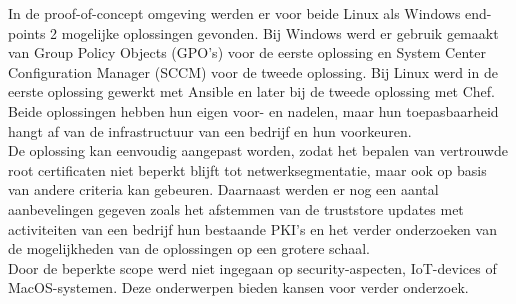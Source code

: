 In de proof-of-concept omgeving werden er voor beide Linux als Windows end-points 2 mogelijke oplossingen gevonden.
Bij Windows werd er gebruik gemaakt van Group Policy Objects (GPO's) voor de eerste oplossing en System Center Configuration Manager (SCCM) voor de tweede oplossing.
Bij Linux werd in de eerste oplossing gewerkt met Ansible en later bij de tweede oplossing met Chef. 
Beide oplossingen hebben hun eigen voor- en nadelen, maar hun toepasbaarheid hangt af van de infrastructuur van een bedrijf en hun voorkeuren. \\

De oplossing kan eenvoudig aangepast worden, zodat het bepalen van vertrouwde root certificaten niet beperkt blijft tot netwerksegmentatie, maar ook op basis van andere criteria kan gebeuren.
Daarnaast werden er nog een aantal aanbevelingen gegeven zoals het afstemmen van de truststore updates met activiteiten van een bedrijf hun bestaande PKI's en het verder onderzoeken van de mogelijkheden van de oplossingen op een grotere schaal. \\


Door de beperkte scope werd niet ingegaan op security-aspecten, IoT-devices of MacOS-systemen. Deze onderwerpen bieden kansen voor verder onderzoek.
